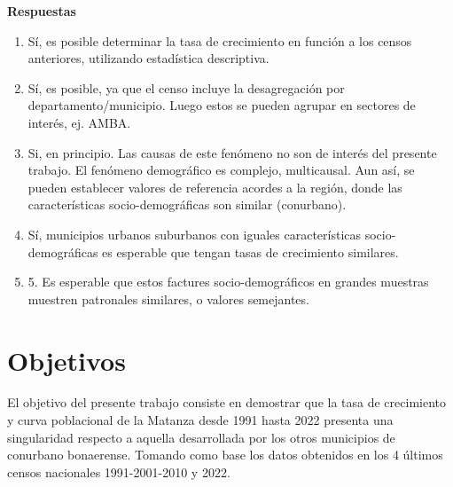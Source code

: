 \documentclass{article}
\theoremstyle{mytheoremstyle}
\theoremstyle{mytheoremstyle}
\theoremstyle{myproblemstyle}
\begin{document}
\textbf{Respuestas}
\begin{enumerate}
  \item Sí, es posible determinar la tasa de crecimiento en función a los censos anteriores, utilizando estadística descriptiva.
  \item Sí, es posible, ya que el censo incluye la desagregación por departamento/municipio. Luego estos se pueden agrupar en sectores de interés, ej. AMBA.
  \item	Si, en principio. Las causas de este fenómeno no son de interés del presente trabajo. El fenómeno demográfico es complejo, multicausal. Aun así, se pueden establecer valores de referencia acordes a la región, donde las características socio-demográficas son similar (conurbano).
  \item	Sí, municipios urbanos suburbanos con iguales características socio-demográficas es esperable que tengan tasas de crecimiento similares.
  \item	5.	Es esperable que estos factures socio-demográficos en grandes muestras muestren patronales similares, o valores semejantes.
\end{enumerate}


\section{Objetivos }
El objetivo del presente trabajo consiste en demostrar que la tasa de crecimiento y curva poblacional de la Matanza desde 1991 hasta 2022 presenta una singularidad respecto a aquella desarrollada por los otros municipios de conurbano bonaerense. Tomando como base los datos obtenidos en los 4 últimos censos nacionales 1991-2001-2010 y 2022.  
\end{document}
